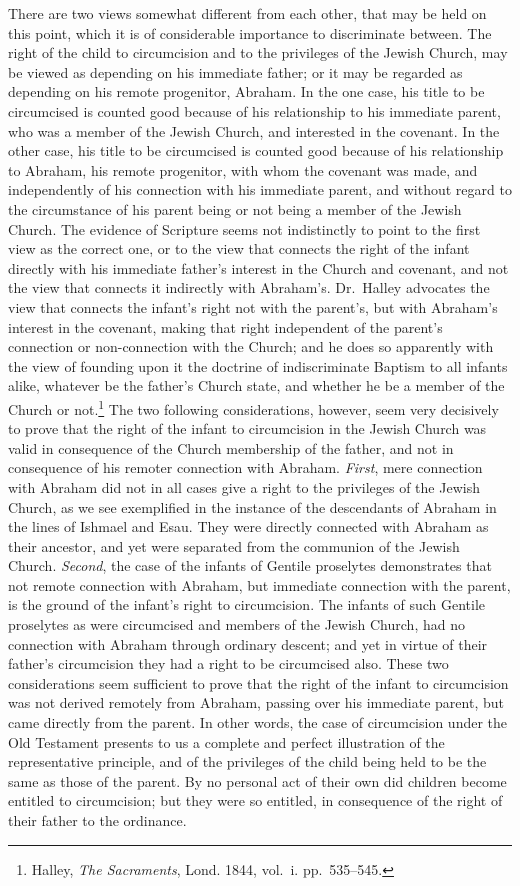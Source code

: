 \documentclass[
]{book}
\begin{document}
There are two views somewhat different from each other, that may be held on this point, which it is of considerable importance to discriminate between. The right of the child to circumcision and to the privileges of the Jewish Church, may be viewed as depending on his immediate father; or it may be regarded as depending on his remote progenitor, Abraham. In the one case, his title to be circumcised is counted good because of his relationship to his immediate parent, who was a member of the Jewish Church, and interested in the covenant. In the other case, his title to be circumcised is counted good because of his relationship to Abraham, his remote progenitor, with whom the covenant was made, and independently of his connection with his immediate parent, and without regard to the circumstance of his parent being or not being a member of the Jewish Church. The evidence of Scripture seems not indistinctly to point to the first view as the correct one, or to the view that connects the right of the infant directly with his immediate father's interest in the Church and covenant, and not the view that connects it indirectly with Abraham's. Dr.~Halley advocates the view that connects the infant's right not with the parent's, but with Abraham's interest in the covenant, making that right independent of the parent's connection or non-connection with the Church; and he does so apparently with the view of founding upon it the doctrine of indiscriminate Baptism to all infants alike, whatever be the father's Church state, and whether he be a member of the Church or not.\footnote{Halley, \emph{The Sacraments}, Lond. 1844, vol.~i. pp.~535--545.} The two following considerations, however, seem very decisively to prove that the right of the infant to circumcision in the Jewish Church was valid in consequence of the Church membership of the father, and not in consequence of his remoter connection with Abraham. \emph{First}, mere connection with Abraham did not in all cases give a right to the privileges of the Jewish Church, as we see exemplified in the instance of the descendants of Abraham in the lines of Ishmael and Esau. They were directly connected with Abraham as their ancestor, and yet were separated from the communion of the Jewish Church. \emph{Second}, the case of the infants of Gentile proselytes demonstrates that not remote connection with Abraham, but immediate connection with the parent, is the ground of the infant's right to circumcision. The infants of such Gentile proselytes as were circumcised and members of the Jewish Church, had no connection with Abraham through ordinary descent; and yet in virtue of their father's circumcision they had a right to be circumcised also. These two considerations seem sufficient to prove that the right of the infant to circumcision was not derived remotely from Abraham, passing over his immediate parent, but came directly from the parent. In other words, the case of circumcision under the Old Testament presents to us a complete and perfect illustration of the representative principle, and of the privileges of the child being held to be the same as those of the parent. By no personal act of their own did children become entitled to circumcision; but they were so entitled, in consequence of the right of their father to the ordinance.
\end{document}
